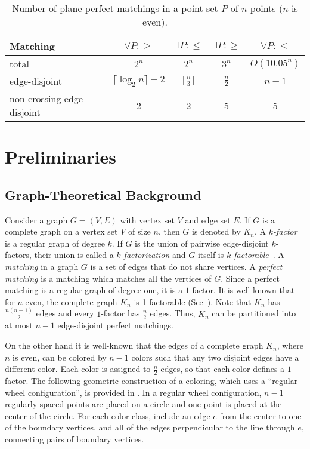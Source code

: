\documentclass[11pt,a4paper]{article}
\begin{document}
\begin{table}
\caption{Number of plane perfect matchings in a point set $P$ of $n$ points ($n$ is even).}
\label{table1}
\centering
    \begin{tabular}{|l||@{\hskip 0.15in}c@{\hskip 0.15in}|@{\hskip 0.15in}c@{\hskip 0.15in}|@{\hskip 0.15in}c@{\hskip 0.15in}|@{\hskip 0.15in}c@{\hskip 0.15in}|}
         \hline
             Matching 	& $\forall P: \ge$ &$\exists P:\le$&$\exists P: \ge$&$\forall P:\le$  \\ \hline\hline
             total& 	$2^n$\cite{Garcia2000, Motzkin1948}&$2^n$\cite{Motzkin1948}&$3^n$\cite{Garcia2000}& $O(10.05^n)$\cite{Sharir2006}\\\hline\hline
		 edge-disjoint&$\lceil\log_2{n}\rceil-2$ &$\lceil \frac{n}{3}\rceil$& $\frac{n}{2}$&$n-1$\\
             non-crossing edge-disjoint& 2 & 2&5&5 \\
         \hline
    \end{tabular}
\end{table}

\section{Preliminaries}
\label{preliminaries}

\subsection{Graph-Theoretical Background}
\label{graph-background-section}
Consider a graph $G=(V,E)$ with vertex set $V$ and edge set $E$. If $G$ is a complete graph on a vertex set $V$ of size $n$, then $G$ is denoted by $K_n$.
A $k${\em -factor} is a regular graph of degree $k$. If $G$ is the union of pairwise edge-disjoint $k$-factors, their union is called a $k${\em-factorization} and $G$ itself is $k${\em-factorable}~\cite{Harary1991}. A {\em matching} in a graph $G$ is a set of edges that do not share vertices. A {\em perfect matching} is a matching which matches all the vertices of $G$. Since a perfect matching is a regular graph of degree one, it is a $1$-factor. It is well-known that for $n$ even, the complete graph $K_n$ is 1-factorable (See~\cite{Harary1991}).
Note that $K_n$ has $\frac{n(n-1)}{2}$ edges and every $1$-factor has $\frac{n}{2}$ edges. Thus, $K_n$ can be partitioned into at most $n-1$ edge-disjoint perfect matchings.

On the other hand it is well-known that the edges of a complete graph $K_n$, where $n$ is even, can be colored by $n − 1$ colors such that any two disjoint edges have a different color. Each color is assigned to $\frac{n}{2}$ edges, so that each color defines a $1$-factor. The following geometric construction of a coloring, which uses a ``regular wheel configuration'', is provided in \cite{Soifer2009}. In a regular wheel configuration, $n − 1$ regularly spaced points are placed on a circle and one point is placed at the center of the circle. For each color class, include an edge $e$ from the center to one of the boundary vertices, and all of the edges perpendicular to the line through $e$, connecting pairs of boundary vertices.
\end{document}
